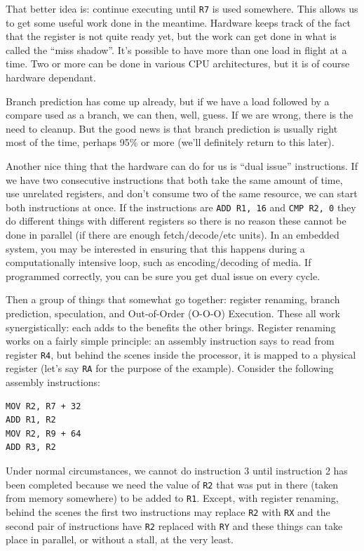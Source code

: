 \documentclass[a4paper]{report}
\begin{document}
That better idea is: continue executing until \texttt{R7} is used somewhere. This allows us to get some useful work done in the meantime. Hardware keeps track of the fact that the register is not quite ready yet, but the work can get done in what is called the ``miss shadow''. It's possible to have more than one load in flight at a time. Two or more can be done in various CPU architectures, but it is of course hardware dependant. 

Branch prediction has come up already, but if we have a load followed by a compare used as a branch, we can then, well, guess. If we are wrong, there is the need to cleanup. But the good news is that branch prediction is usually right most of the time, perhaps 95\% or more (we'll definitely return to this later).

Another nice thing that the hardware can do for us is ``dual issue'' instructions. If we have two consecutive instructions that both take the same amount of time, use unrelated registers, and don't consume two of the same resource, we can start both instructions at once. If the instructions are \texttt{ADD R1, 16} and \texttt{CMP R2, 0} they do different things with different registers so there is no reason these cannot be done in parallel (if there are enough fetch/decode/etc units). In an embedded system, you may be interested in ensuring that this happens during a computationally intensive loop, such as encoding/decoding of media. If programmed correctly, you can be sure you get dual issue on every cycle.

Then a group of things that somewhat go together: register renaming, branch prediction, speculation, and Out-of-Order (O-O-O) Execution. These all work synergistically: each adds to the benefits the other brings. Register renaming works on a fairly simple principle: an assembly instruction says to read from register \texttt{R4}, but behind the scenes inside the processor, it is mapped to a physical register (let's say \texttt{RA} for the purpose of the example). Consider the following assembly instructions:

\begin{verbatim}
MOV R2, R7 + 32
ADD R1, R2
MOV R2, R9 + 64
ADD R3, R2
\end{verbatim}

Under normal circumstances, we cannot do instruction 3 until instruction 2 has been completed because we need the value of \texttt{R2} that was put in there (taken from memory somewhere) to be added to \texttt{R1}. Except, with register renaming, behind the scenes the first two instructions may replace \texttt{R2} with \texttt{RX} and the second pair of instructions have \texttt{R2} replaced with \texttt{RY} and these things can take place in parallel, or without a stall, at the very least.
\end{document}
